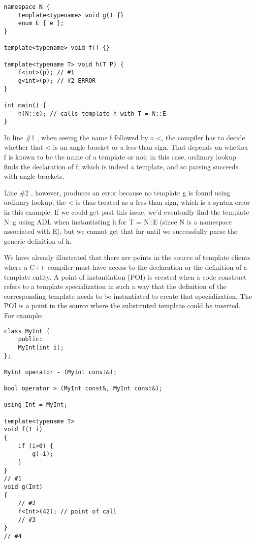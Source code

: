 \begin{lstlisting}[style=styleCXX]
namespace N {
	template<typename> void g() {}
	enum E { e };
}

template<typename> void f() {}

template<typename T> void h(T P) {
	f<int>(p); // #1
	g<int>(p); // #2 ERROR
}

int main() {
	h(N::e); // calls template h with T = N::E
}
\end{lstlisting}

In line \#1 , when seeing the name f followed by a <, the compiler has to decide whether that < is an angle bracket or a less-than sign. That depends on whether f is known to be the name of a template or not; in this case, ordinary lookup finds the declaration of f, which is indeed a template, and so parsing succeeds with angle brackets.

Line \#2 , however, produces an error because no template g is found using ordinary lookup; the < is thus treated as a less-than sign, which is a syntax error in this example. If we could get past this issue, we’d eventually find the template N::g using ADL when instantiating h for T = N::E (since N is a namespace associated with E), but we cannot get that far until we successfully parse the generic definition of h.


We have already illustrated that there are points in the source of template clients where a C++ compiler must have access to the declaration or the definition of a template entity. A point of instantiation (POI) is created when a code construct refers to a template specialization in such a way that the definition of the corresponding template needs to be instantiated to create that specialization. The POI is a point in the source where the substituted template could be inserted. For example:

\begin{lstlisting}[style=styleCXX]
class MyInt {
	public:
	MyInt(int i);
};

MyInt operator - (MyInt const&);

bool operator > (MyInt const&, MyInt const&);

using Int = MyInt;

template<typename T>
void f(T i)
{
	if (i>0) {
		g(-i);
	}
}
// #1
void g(Int)
{
	// #2
	f<Int>(42); // point of call
	// #3
}
// #4
\end{lstlisting}

